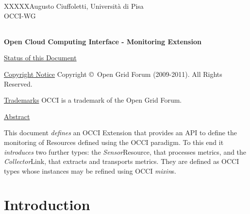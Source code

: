 \documentclass[10pt,a4paper]{article}
\newcommand{\doccode}{XXXXX}
\begin{document}
\thispagestyle{empty}

\doccode \hfill Augusto Ciuffoletti, Università di Pisa\\ 
OCCI-WG\\
\\

\vspace*{0.5in}

\begin{Large}
\textbf{Open Cloud Computing Interface - Monitoring Extension}
\end{Large}

\vspace*{0.5in}

\newcommand{\rem}[2]{}

\newcommand{\oc}[0]{\tt OCCI}
\newcommand{\mi}[0]{{\em mixin}}
\newcommand{\metr}[0]{{\em metric}}
\newcommand{\aggr}[0]{{\em aggregator}}
\newcommand{\publ}[0]{{\em publisher}}
\newcommand{\ent}[0]{{\em Entity}}
\newcommand{\rs}[0]{{\em Resource}}
\renewcommand{\ln}[0]{{\em Link}}
\newcommand{\sens}[0]{{\em Sensor}}
\newcommand{\comp}[0]{{\em Compute}}
\newcommand{\coll}[0]{{\em Collector}}

\underline{Status of this Document}


\underline{Copyright Notice}
Copyright \copyright ~Open Grid Forum (2009-2011). All Rights Reserved.

\underline{Trademarks}
OCCI is a trademark of the Open Grid Forum.

\underline{Abstract}


This document {\em defines} an OCCI Extension that provides an API to define the monitoring of Resources defined using the OCCI paradigm. To this end it {\em introduces} two further types: the \sens Resource, that processes metrics, and the \coll Link, that extracts and transports metrics. They are defined as OCCI types whose instances may be refined using OCCI \mi s.

\newpage
\tableofcontents
\newpage

\section{Introduction}


\end{document}
